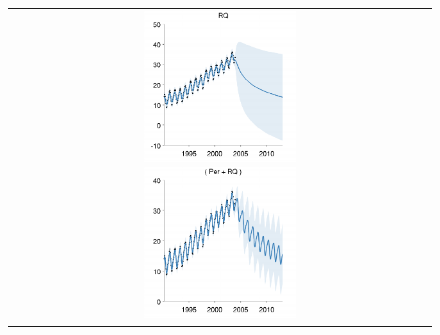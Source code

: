 \documentclass[twoside]{article}
\begin{document}
\begin{figure}[h!]
\centering
\newcommand{\wmg}{5.5cm}  %
\newcommand{\hmg}{4cm}  %
\begin{tabular}{c}
 \includegraphics[width=\wmg,height=\hmg]{../figures/decomposition/03-mauna2003-s_max_level_0/03-mauna2003-s_all_small} 
 \includegraphics[width=\wmg,height=\hmg]{../figures/decomposition/03-mauna2003-s_max_level_1/03-mauna2003-s_all_small}

\end{tabular}
\end{figure}
\end{document}
